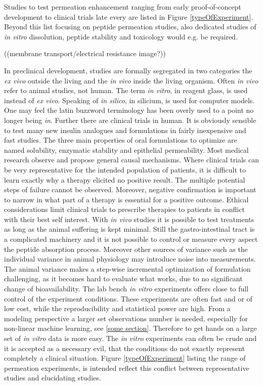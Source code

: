 Studies to test permeation enhancement ranging from early proof-of-concept development to clinical trials late every are listed in Figure \ref{typeOfExperiment}. Beyond this list focusing on peptide permeation studies, also dedicated studies of \textit{in vitro} dissolution, peptide stability and toxicology would e.g. be required.

((membrane transport/electrical resistance image?))

In preclinical development, studies are formally segregated in two categories the \textit{ex vivo} outside the living and the \textit{in vivo} inside the living organism. Often \textit{in vivo} refer to animal studies, not human. The term \textit{in vitro}, in reagent glass, is used instead of \textit{ex vivo}. Speaking of \textit{in silico}, in silicium, is used for computer models. One may feel the latin buzzword terminology has been overly used to a point no longer being \textit{in}. Further there are clinical trials in human. It is obviously sensible to test many new insulin analogues and formulations in fairly inexpensive and fast studies. The three main properties of oral formulations to optimize are named  solubility, enzymatic stability and epithelial permeability. Most medical research observe and propose general causal mechanisms. Where clinical trials can be very representative for the intended population of patients, it is difficult to learn exactly why a therapy elicited no positive result. The multiple potential steps of failure cannot be observed. Moreover, negative confirmation is important to narrow in what part of a therapy is essential for a positive outcome. Ethical considerations limit clinical trials to prescribe therapies to patients in conflict with their best self interest. With \textit{in vivo} studies it is possible to test treatments as long as the animal suffering is kept minimal. Still the gastro-intestinal tract is a complicated machinery and it is not possible to control or measure every aspect the peptide absorption process. Moreover other sources of variance such as the individual variance in animal physiology may introduce noise into measurements. The animal variance makes a step-wise incremental optimization of formulation challenging, as it becomes hard to evaluate what works, due to no significant change of bioavailability. The lab bench \textit{in vitro} experiments offers close to full control of the experiment conditions. These experiments are often fast and or of low cost, while the reproducibility and statistical power are high. From a modeling perspective a larger set observations number is needed, especially for non-linear machine learning, see \ref{some section}. Therefore to get hands on a large set of \textit{in vitro} data is more easy. The \textit{in vitro} experiments can often be crude and it is accepted as a necessary evil, that the conditions do not exactly represent completely a clinical situation. Figure \ref{typeOfExperiment} listing the range of permeation experiments, is intended reflect this conflict between representative studies and elucidating studies.
